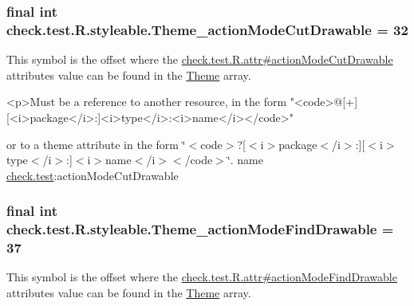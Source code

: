 \subsubsection[{Theme\+\_\+action\+Mode\+Cut\+Drawable}]{\setlength{\rightskip}{0pt plus 5cm}final int check.\+test.\+R.\+styleable.\+Theme\+\_\+action\+Mode\+Cut\+Drawable = 32\hspace{0.3cm}{\ttfamily [static]}}\label{classcheck_1_1test_1_1_r_1_1styleable_a46d9dab18374fb132f95dae524a5d910}
This symbol is the offset where the \hyperlink{classcheck_1_1test_1_1_r_1_1attr_a691190563ca01ec16e2456ac64fc5a72}{check.\+test.\+R.\+attr\#action\+Mode\+Cut\+Drawable} attribute\textquotesingle{}s value can be found in the \hyperlink{classcheck_1_1test_1_1_r_1_1styleable_acca726d02016a0cf607782ec3a436a81}{Theme} array.

\begin{DoxyVerb}      <p>Must be a reference to another resource, in the form "<code>@[+][<i>package</i>:]<i>type</i>:<i>name</i></code>"
\end{DoxyVerb}
 or to a theme attribute in the form \char`\"{}$<$code$>$?\mbox{[}$<$i$>$package$<$/i$>$\+:\mbox{]}\mbox{[}$<$i$>$type$<$/i$>$\+:\mbox{]}$<$i$>$name$<$/i$>$$<$/code$>$\char`\"{}.  name \hyperlink{namespacecheck_1_1test}{check.\+test}\+:action\+Mode\+Cut\+Drawable \hypertarget{classcheck_1_1test_1_1_r_1_1styleable_af1e1008c65426da3eab077f1a462c7cb}{}
\subsubsection[{Theme\+\_\+action\+Mode\+Find\+Drawable}]{\setlength{\rightskip}{0pt plus 5cm}final int check.\+test.\+R.\+styleable.\+Theme\+\_\+action\+Mode\+Find\+Drawable = 37\hspace{0.3cm}{\ttfamily [static]}}\label{classcheck_1_1test_1_1_r_1_1styleable_af1e1008c65426da3eab077f1a462c7cb}
This symbol is the offset where the \hyperlink{classcheck_1_1test_1_1_r_1_1attr_a535b66e1a04df112a1eb7fc3a8c05b9a}{check.\+test.\+R.\+attr\#action\+Mode\+Find\+Drawable} attribute\textquotesingle{}s value can be found in the \hyperlink{classcheck_1_1test_1_1_r_1_1styleable_acca726d02016a0cf607782ec3a436a81}{Theme} array.

